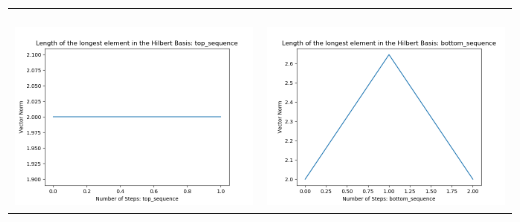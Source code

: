\documentclass[10pt]{article}
\begin{document}
\begin{tabular}{c|c}
\begin{minipage}{.45\textwidth}
\end{minipage} \\ \\
\hline \\\begin{minipage}{.45\textwidth}
\includegraphics[width=\textwidth]{"DATA/5d/6 generators 1 bound F/top_sequence LENGTH"}
\end{minipage} &
\begin{minipage}{.45\textwidth}
\includegraphics[width=\textwidth]{"DATA/5d/6 generators 1 bound F bottomup/bottom_sequence LENGTH"}
\end{minipage}
\end{tabular}
\end{document}
